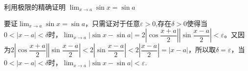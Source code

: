 \begin{example}{利用极限的精确证明}{}
   $\displaystyle\lim_{x\to a}\sin x=\sin a$
\end{example}
\begin{solution}
    要证$\displaystyle\lim_{x\to a}\sin x=\sin a$，只需证对于任意$\varepsilon>0$,存在$\delta>0$使得当$0<|x-a|<\delta$时，$\displaystyle\lim_{x\to a}|\sin x-\sin a|=2|\cos\dfrac{x+a}{2}||\sin\dfrac{x-a}{2}|<\varepsilon$。又因为$2|\cos\dfrac{x+a}{2}||\sin\dfrac{x-a}{2}|<2|\sin\dfrac{x-a}{2}|<2|\dfrac{x-a}{2}|=|x-a|$，所以取$\delta=\varepsilon$，当$0<|x-a|<\delta$时，$\displaystyle\lim_{x\to a}|\sin x-\sin a|<\varepsilon$.
\end{solution}
